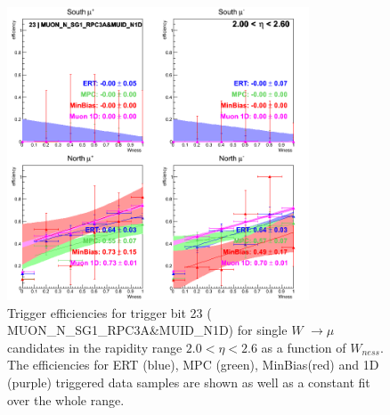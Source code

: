 \begin{figure}[h!]

  \centering

  \includegraphics[width=0.8\textwidth]{./figures/run13_trigeffisn_eta2_trig23_lin.png}
  \caption{\label{fig:run13_trigeffisn_eta2_nper0_trig23_lin} Trigger efficiencies for trigger bit 23 ( MUON\_N\_SG1\_RPC3A\&MUID\_N1D) for single $W$ $\rightarrow \mu$ candidates in the rapidity range $ 2.0 < \eta < 2.6$ as a function of $W_{ness}$. The efficiencies for ERT (blue), MPC (green), MinBias(red) and 1D (purple) triggered data samples are shown as well as a constant fit over the whole range.}

\end{figure}
\clearpage
